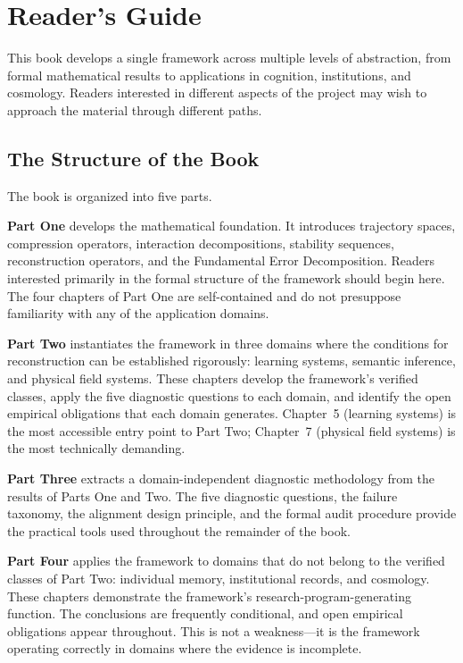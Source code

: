 \chapter*{Reader's Guide}

This book develops a single framework across multiple levels of abstraction, from formal mathematical results to applications in cognition, institutions, and cosmology. Readers interested in different aspects of the project may wish to approach the material through different paths.

\section*{The Structure of the Book}

The book is organized into five parts.

\textbf{Part One} develops the mathematical foundation. It introduces trajectory spaces, compression operators, interaction decompositions, stability sequences, reconstruction operators, and the Fundamental Error Decomposition. Readers interested primarily in the formal structure of the framework should begin here. The four chapters of Part One are self-contained and do not presuppose familiarity with any of the application domains.

\textbf{Part Two} instantiates the framework in three domains where the conditions for reconstruction can be established rigorously: learning systems, semantic inference, and physical field systems. These chapters develop the framework's verified classes, apply the five diagnostic questions to each domain, and identify the open empirical obligations that each domain generates. Chapter~5 (learning systems) is the most accessible entry point to Part Two; Chapter~7 (physical field systems) is the most technically demanding.

\textbf{Part Three} extracts a domain-independent diagnostic methodology from the results of Parts One and Two. The five diagnostic questions, the failure taxonomy, the alignment design principle, and the formal audit procedure provide the practical tools used throughout the remainder of the book.

\textbf{Part Four} applies the framework to domains that do not belong to the verified classes of Part Two: individual memory, institutional records, and cosmology. These chapters demonstrate the framework's research-program-generating function. The conclusions are frequently conditional, and open empirical obligations appear throughout. This is not a weakness---it is the framework operating correctly in domains where the evidence is incomplete.


